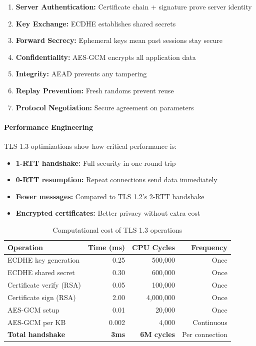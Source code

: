 \documentclass[11pt,a4paper]{article}
\begin{document}
\begin{enumerate}
    \item \textbf{Server Authentication:} Certificate chain + signature prove server identity
    \item \textbf{Key Exchange:} ECDHE establishes shared secrets
    \item \textbf{Forward Secrecy:} Ephemeral keys mean past sessions stay secure
    \item \textbf{Confidentiality:} AES-GCM encrypts all application data
    \item \textbf{Integrity:} AEAD prevents any tampering
    \item \textbf{Replay Prevention:} Fresh randoms prevent reuse
    \item \textbf{Protocol Negotiation:} Secure agreement on parameters
\end{enumerate}

\paragraph{Performance Engineering}

TLS 1.3 optimizations show how critical performance is:

\begin{itemize}
    \item \textbf{1-RTT handshake:} Full security in one round trip
    \item \textbf{0-RTT resumption:} Repeat connections send data immediately
    \item \textbf{Fewer messages:} Compared to TLS 1.2's 2-RTT handshake
    \item \textbf{Encrypted certificates:} Better privacy without extra cost
\end{itemize}

\begin{table}[h]
\centering
\begin{tabular}{|l|r|r|r|}
\hline
\textbf{Operation} & \textbf{Time (ms)} & \textbf{CPU Cycles} & \textbf{Frequency} \\
\hline
ECDHE key generation & 0.25 & 500,000 & Once \\
ECDHE shared secret & 0.30 & 600,000 & Once \\
Certificate verify (RSA) & 0.05 & 100,000 & Once \\
Certificate sign (RSA) & 2.00 & 4,000,000 & Once \\
AES-GCM setup & 0.01 & 20,000 & Once \\
AES-GCM per KB & 0.002 & 4,000 & Continuous \\
\hline
\textbf{Total handshake} & \textbf{~3ms} & \textbf{~6M cycles} & Per connection \\
\hline
\end{tabular}
\caption{Computational cost of TLS 1.3 operations}
\end{table}
\end{document}

